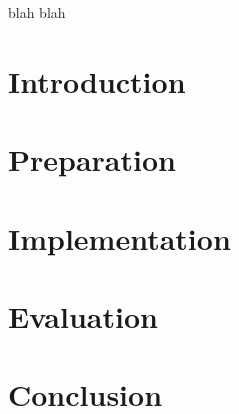 \documentclass[12pt]{report}
\begin{document}
blah blah

\tableofcontents

\chapter{Introduction}



\chapter{Preparation} \label{preparation}



\chapter{Implementation} \label{implementation}



\chapter{Evaluation} \label{evaluation}



\chapter{Conclusion}



% 
% 


{}
\end{document}
